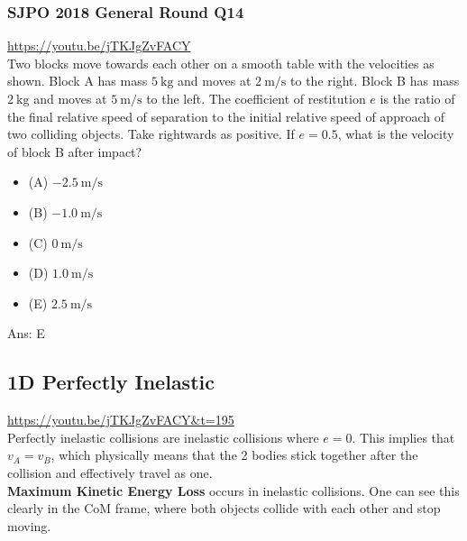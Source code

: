 \documentclass{article}
\begin{document}
\subsubsection{SJPO 2018 General Round Q14}
\url{https://youtu.be/jTKJgZvFACY}\\
Two blocks move towards each other on a smooth table with the velocities as shown. Block A has mass $5 \mathrm{~kg}$ and moves at $2 \mathrm{~m} / \mathrm{s}$ to the right. Block B has mass $2 \mathrm{~kg}$ and moves at $5 \mathrm{~m} / \mathrm{s}$ to the left. The coefficient of restitution $e$ is the ratio of the final relative speed of separation to the initial relative speed of approach of two colliding objects. Take rightwards as positive. If $e=0.5$, what is the velocity of block B after impact?
\begin{itemize}
\item[] (A) $-2.5 \mathrm{~m} / \mathrm{s}$
\item[] (B) $-1.0 \mathrm{~m} / \mathrm{s}$
\item[] (C) $0 \mathrm{~m} / \mathrm{s}$
\item[] (D) $ 1.0 \mathrm{~m} / \mathrm{s}$
\item[] (E) $ 2.5 \mathrm{~m} / \mathrm{s}$
\end{itemize}
Ans: \ifpaper E \fi
\subsection{1D Perfectly Inelastic}
\url{https://youtu.be/jTKJgZvFACY&t=195}\\
Perfectly inelastic collisions are inelastic collisions where $e=0$. This implies that $v_A = v_B$, which physically means that the 2 bodies stick together after the collision and effectively travel as one. \\[10pt]
\textbf{Maximum Kinetic Energy Loss} occurs in inelastic collisions. One can see this clearly in the CoM frame, where both objects collide with each other and stop moving. 
\end{document}
